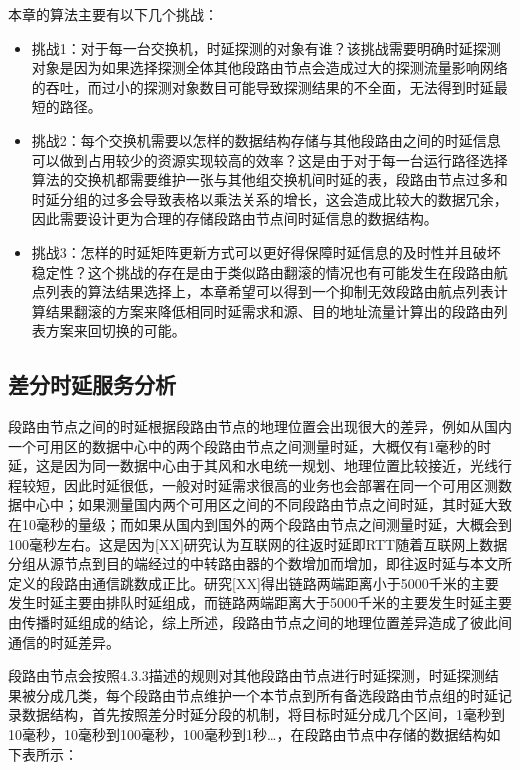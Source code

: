 本章的算法主要有以下几个挑战：

\begin{itemize}
\item 挑战1：对于每一台交换机，时延探测的对象有谁？该挑战需要明确时延探测对象是因为如果选择探测全体其他段路由节点会造成过大的探测流量影响网络的吞吐，而过小的探测对象数目可能导致探测结果的不全面，无法得到时延最短的路径。
\item 挑战2：每个交换机需要以怎样的数据结构存储与其他段路由之间的时延信息可以做到占用较少的资源实现较高的效率？这是由于对于每一台运行路径选择算法的交换机都需要维护一张与其他组交换机间时延的表，段路由节点过多和时延分组的过多会导致表格以乘法关系的增长，这会造成比较大的数据冗余，因此需要设计更为合理的存储段路由节点间时延信息的数据结构。
\item 挑战3：怎样的时延矩阵更新方式可以更好得保障时延信息的及时性并且破坏稳定性？这个挑战的存在是由于类似路由翻滚的情况也有可能发生在段路由航点列表的算法结果选择上，本章希望可以得到一个抑制无效段路由航点列表计算结果翻滚的方案来降低相同时延需求和源、目的地址流量计算出的段路由列表方案来回切换的可能。
\end{itemize}

\subsection{差分时延服务分析}

段路由节点之间的时延根据段路由节点的地理位置会出现很大的差异，例如从国内一个可用区的数据中心中的两个段路由节点之间测量时延，大概仅有1毫秒的时延，这是因为同一数据中心由于其风和水电统一规划、地理位置比较接近，光线行程较短，因此时延很低，一般对时延需求很高的业务也会部署在同一个可用区测数据中心中；如果测量国内两个可用区之间的不同段路由节点之间时延，其时延大致在10毫秒的量级；而如果从国内到国外的两个段路由节点之间测量时延，大概会到100毫秒左右。这是因为[XX]研究认为互联网的往返时延即RTT随着互联网上数据分组从源节点到目的端经过的中转路由器的个数增加而增加，即往返时延与本文所定义的段路由通信跳数成正比。研究[XX]得出链路两端距离小于5000千米的主要发生时延主要由排队时延组成，而链路两端距离大于5000千米的主要发生时延主要由传播时延组成的结论，综上所述，段路由节点之间的地理位置差异造成了彼此间通信的时延差异。

段路由节点会按照4.3.3描述的规则对其他段路由节点进行时延探测，时延探测结果被分成几类，每个段路由节点维护一个本节点到所有备选段路由节点组的时延记录数据结构，首先按照差分时延分段的机制，将目标时延分成几个区间，1毫秒到10毫秒，10毫秒到100毫秒，100毫秒到1秒…，在段路由节点中存储的数据结构如下表所示：

